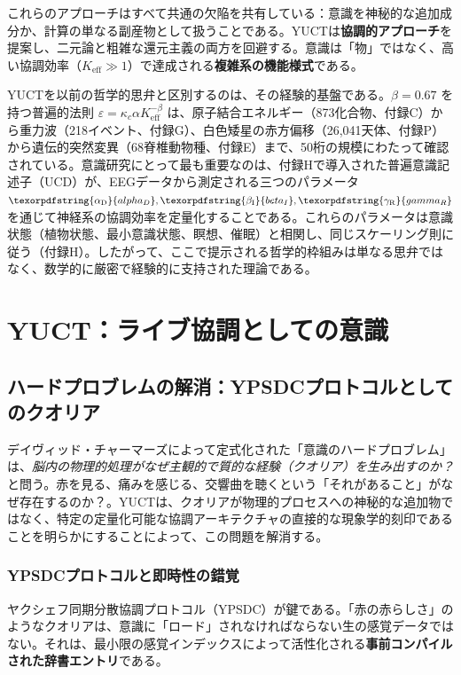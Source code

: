 \documentclass[12pt,a4paper]{article}
\DeclareRobustCommand{\alD}{\texorpdfstring{\ensuremath{\alpha_{\mathrm{D}}}}{alpha_D}}
\DeclareRobustCommand{\beI}{\texorpdfstring{\ensuremath{\beta_{\mathrm{I}}}}{beta_I}}
\DeclareRobustCommand{\gaR}{\texorpdfstring{\ensuremath{\gamma_{\mathrm{R}}}}{gamma_R}}
\newcommand{\eff}{\mathrm{eff}}
\newcommand{\Ke}{K_{\eff}}
\begin{document}
	これらのアプローチはすべて共通の欠陥を共有している：意識を神秘的な追加成分か、計算の単なる副産物として扱うことである。YUCTは\textbf{協調的アプローチ}を提案し、二元論と粗雑な還元主義の両方を回避する。意識は「物」ではなく、高い協調効率（\(\Ke \gg 1\)）で達成される\textbf{複雑系の機能様式}である。
	
	YUCTを以前の哲学的思弁と区別するのは、その経験的基盤である。\(\beta = 0.67\) を持つ普遍的法則 \(\varepsilon = \kappa_c \alpha \Ke^{-\beta}\) は、原子結合エネルギー（873化合物、付録C）から重力波（218イベント、付録G）、白色矮星の赤方偏移（26,041天体、付録P）から遺伝的突然変異（68脊椎動物種、付録E）まで、50桁の規模にわたって確認されている。意識研究にとって最も重要なのは、付録Hで導入された普遍意識記述子（UCD）が、EEGデータから測定される三つのパラメータ \(\alD, \beI, \gaR\) を通じて神経系の協調効率を定量化することである。これらのパラメータは意識状態（植物状態、最小意識状態、瞑想、催眠）と相関し、同じスケーリング則に従う（付録H）。したがって、ここで提示される哲学的枠組みは単なる思弁ではなく、数学的に厳密で経験的に支持された理論である。
	
	\section{YUCT：ライブ協調としての意識}
	
	\subsection{ハードプロブレムの解消：YPSDCプロトコルとしてのクオリア}
	
	デイヴィッド・チャーマーズによって定式化された「意識のハードプロブレム」は、\textit{脳内の物理的処理がなぜ主観的で質的な経験（クオリア）を生み出すのか？} と問う。赤を見る、痛みを感じる、交響曲を聴くという「それがあること」がなぜ存在するのか？\cite{Chalmers1995}。YUCTは、クオリアが物理的プロセスへの神秘的な追加物ではなく、特定の定量化可能な協調アーキテクチャの直接的な現象学的刻印であることを明らかにすることによって、この問題を解消する。
	
	\subsubsection{YPSDCプロトコルと即時性の錯覚}
	
	ヤクシェフ同期分散協調プロトコル（YPSDC）が鍵である。「赤の赤らしさ」のようなクオリアは、意識に「ロード」されなければならない生の感覚データではない。それは、最小限の感覚インデックスによって活性化される\textbf{事前コンパイルされた辞書エントリ}である。
	
\end{document}
